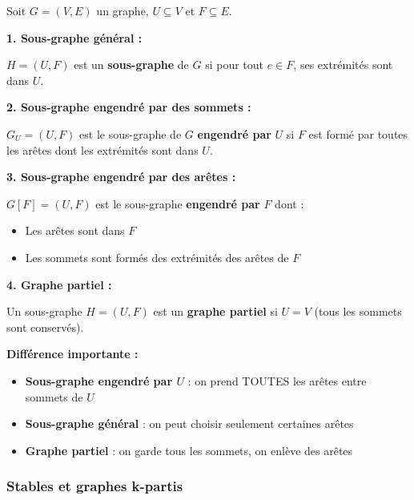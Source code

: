 \documentclass[12pt,a4paper]{article}
\begin{document}
\begin{definition}
Soit $G = (V, E)$ un graphe, $U \subseteq V$ et $F \subseteq E$.

\textbf{1. Sous-graphe général :}

$H = (U, F)$ est un \textcolor{titrebleu}{\textbf{sous-graphe}} de $G$ si pour tout $e \in F$, ses extrémités sont dans $U$.

\textbf{2. Sous-graphe engendré par des sommets :}

$G_U = (U, F)$ est le sous-graphe de $G$ \textcolor{defvert}{\textbf{engendré par}} $U$ si $F$ est formé par toutes les arêtes dont les extrémités sont dans $U$.

\textbf{3. Sous-graphe engendré par des arêtes :}

$G[F] = (U, F)$ est le sous-graphe \textcolor{algoviolet}{\textbf{engendré par}} $F$ dont :
\begin{itemize}
    \item Les arêtes sont dans $F$
    \item Les sommets sont formés des extrémités des arêtes de $F$
\end{itemize}

\textbf{4. Graphe partiel :}

Un sous-graphe $H = (U, F)$ est un \textcolor{exempleorange}{\textbf{graphe partiel}} si $U = V$ (tous les sommets sont conservés).
\end{definition}

\begin{notecours}
\textbf{Différence importante :}
\begin{itemize}
    \item \textbf{Sous-graphe engendré par $U$} : on prend TOUTES les arêtes entre sommets de $U$
    \item \textbf{Sous-graphe général} : on peut choisir seulement certaines arêtes
    \item \textbf{Graphe partiel} : on garde tous les sommets, on enlève des arêtes
\end{itemize}
\end{notecours}

\subsubsection{Stables et graphes k-partis}
\end{document}
